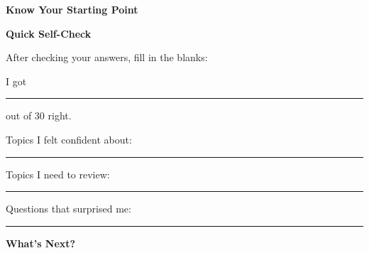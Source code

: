 \clearpage
\thispagestyle{empty}
{\sffamily

\begin{center}
{\fontsize{22}{26}\selectfont\bfseries\color{funBlue} \faChartBar\hspace{3mm}Know Your Starting Point\hspace{3mm}\faChartBar}

\vspace{2mm}
{\color{funGray}\hrulefill}
\end{center}

\vspace{3mm}

\begin{tcolorbox}[
    enhanced,
    colback=funBlueLight,
    colframe=funBlue!50,
    arc=10pt,
    boxrule=1.5pt,
    left=6mm, right=6mm, top=5mm, bottom=5mm,
]
{\large\bfseries\color{funBlueDark} \faClipboardList\hspace{2mm}Quick Self-Check}

\vspace{2mm}

After checking your answers, fill in the blanks:

\vspace{3mm}

\faCheckCircle\hspace{2mm}I got \rule[-2pt]{1.5cm}{0.5pt} out of 30 right.

\vspace{2mm}

\faSmile\hspace{2mm}Topics I felt confident about: \rule[-2pt]{5cm}{0.5pt}

\vspace{2mm}

\faPuzzlePiece\hspace{2mm}Topics I need to review: \rule[-2pt]{5cm}{0.5pt}

\vspace{2mm}

\faSurprise\hspace{2mm}Questions that surprised me: \rule[-2pt]{4.5cm}{0.5pt}
\end{tcolorbox}

\vspace{3mm}

\begin{tcolorbox}[
    enhanced,
    colback=funGreenLight,
    colframe=funGreen!50,
    arc=10pt,
    boxrule=1pt,
    left=6mm, right=6mm, top=4mm, bottom=4mm,
]
{\bfseries\color{funGreenDark} \faSeedling\hspace{2mm}What's Next?}


\end{tcolorbox}}
